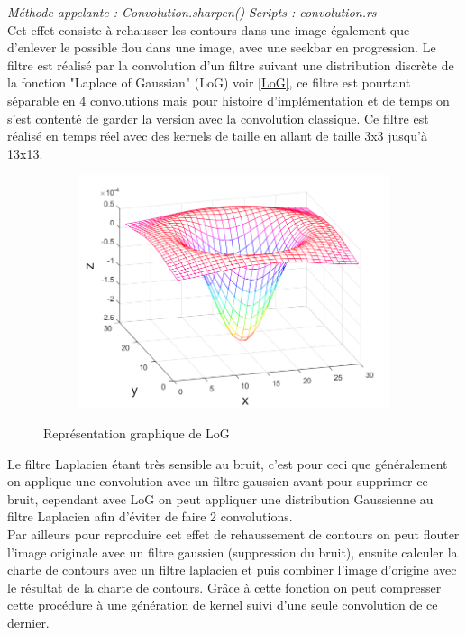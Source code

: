         \emph{Méthode appelante : Convolution.sharpen()}
        \emph{Scripts : convolution.rs} 
        \\

        Cet effet consiste à rehausser les contours dans une image également que d'enlever le possible flou dans une image, avec une seekbar en progression.
        Le filtre est réalisé par la convolution d'un filtre suivant une distribution discrète de la fonction "Laplace of Gaussian" (LoG) voir \ref{LoG},
        ce filtre est pourtant séparable en 4 convolutions mais pour histoire d'implémentation et de temps on s'est contenté de garder la version avec la convolution classique.
        Ce filtre est réalisé en temps réel avec des kernels de taille en allant de taille 3x3 jusqu'à 13x13.

        
        \begin{figure}[!h]
            \centering
            \begin{subfigure}[b]{0.8\textwidth}
                \includegraphics[width=1\textwidth]{report_src/effects/laplacianGaussian.png}
            \end{subfigure}
            \caption*{Représentation graphique de LoG}
        \end{figure}

        Le filtre Laplacien étant très sensible au bruit, c'est pour ceci que généralement on applique une convolution avec un filtre gaussien avant pour supprimer ce bruit,
        cependant avec LoG on peut appliquer une distribution Gaussienne au filtre Laplacien afin d'éviter de faire 2 convolutions.
        \\
        Par ailleurs pour reproduire cet effet de rehaussement de contours on peut
        flouter l'image originale avec un filtre gaussien (suppression du bruit), ensuite calculer la charte de contours avec un filtre laplacien et puis combiner l'image d'origine avec le résultat
        de la charte de contours.
        Grâce à cette fonction on peut compresser cette procédure à une génération de kernel suivi d'une seule convolution de ce dernier.
        \\

